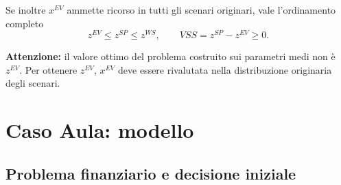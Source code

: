 \documentclass[handout]{beamer}%
\providecommand{\1}{\mathbf{1}}
\begin{document}
\begin{frame}
Se inoltre $x^{EV}$ ammette
ricorso in tutti gli scenari originari,
vale l'ordinamento completo
\vspace{-0.1cm}
\[
z^{EV}\leq z^{SP}\leq z^{WS},
\qquad
VSS=z^{SP}-z^{EV}\geq0.
\]


\vspace{-0.1cm}
\textbf{Attenzione:} il valore ottimo del problema costruito sui parametri
medi non \`e \(z^{EV}\). Per ottenere \(z^{EV}\), \(x^{EV}\) deve essere
rivalutata nella distribuzione originaria degli scenari.

\transboxout%
\end{frame}%



\section{Caso Aula: modello}


\subsection{Problema finanziario e decisione iniziale}
\end{document}
